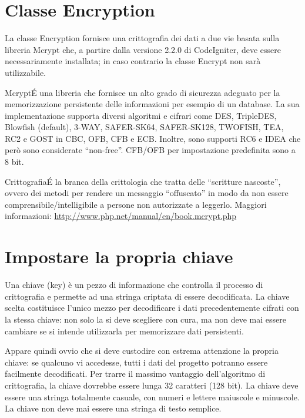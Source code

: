 \section{Classe Encryption}
\label{class:encryption}

La classe Encryption fornisce una crittografia dei dati a due vie basata sulla libreria Mcrypt che, a partire dalla versione 2.2.0 di CodeIgniter, deve essere necessariamente installata; in caso contrario la classe Encrypt non sarà utilizzabile.

\begin{deftabv}{Mcrypt}{\'E una libreria che fornisce un alto grado di sicurezza adeguato per la memorizzazione persistente delle informazioni per esempio di un database. La sua implementazione supporta diversi algoritmi e cifrari come DES, TripleDES, Blowfish (default), 3-WAY, SAFER-SK64, SAFER-SK128, TWOFISH, TEA, RC2 e GOST in CBC, OFB, CFB e ECB. Inoltre, sono supporti RC6 e IDEA che però sono considerate ``non-free''. CFB/OFB per impostazione predefinita sono a 8 bit.}
\end{deftabv}

\begin{deftab}{Crittografia}{\'E la branca della crittologia che tratta delle ``scritture nascoste'', ovvero dei metodi per rendere un messaggio ``offuscato'' in modo da non essere comprensibile/intelligibile a persone non autorizzate a leggerlo. Maggiori informazioni: \url{http://www.php.net/manual/en/book.mcrypt.php}}
\end{deftab}

\section*{Impostare la propria chiave}
Una chiave (key) è un pezzo di informazione che controlla il processo di crittografia e permette ad una stringa criptata di essere decodificata. La chiave scelta costituisce l'unico mezzo per decodificare i dati precedentemente cifrati con la stessa chiave: non solo la si deve scegliere con cura, ma non deve mai essere cambiare se si intende utilizzarla per memorizzare dati persistenti.

Appare quindi ovvio che si deve custodire con estrema attenzione la propria chiave: se qualcuno vi accedesse, tutti i dati del progetto potranno essere facilmente decodificati. Per trarre il massimo vantaggio dell'algoritmo di crittografia, la chiave dovrebbe essere lunga 32 caratteri (128 bit). La chiave deve essere una stringa totalmente casuale, con numeri e lettere maiuscole e minuscole. La chiave non deve mai essere una stringa di testo semplice.

